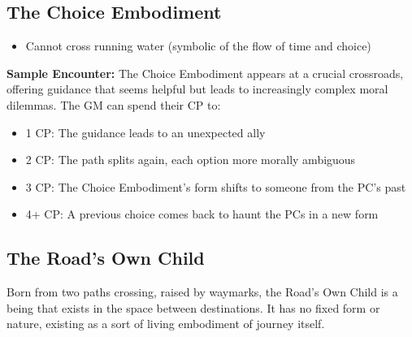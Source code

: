 \documentclass[11pt]{article}
\newenvironment{monsterentry}[1]{%
  \begin{mdframed}[backgroundcolor=shadecolor, linewidth=0pt, leftmargin=0pt, rightmargin=0pt]%
  \subsection*{#1}%
}{%
  \end{mdframed}%
}
\begin{document}
\begin{monsterentry}{The Choice Embodiment}
\begin{itemize}
    \item Cannot cross running water (symbolic of the flow of time and choice)
\end{itemize}
\textbf{Sample Encounter:} The Choice Embodiment appears at a crucial crossroads, offering guidance that seems helpful but leads to increasingly complex moral dilemmas. The GM can spend their CP to:
\begin{itemize}
    \item 1 CP: The guidance leads to an unexpected ally
    \item 2 CP: The path splits again, each option more morally ambiguous
    \item 3 CP: The Choice Embodiment's form shifts to someone from the PC's past
    \item 4+ CP: A previous choice comes back to haunt the PCs in a new form
\end{itemize}
\end{monsterentry}

\subsection{The Road's Own Child}

Born from two paths crossing, raised by waymarks, the Road's Own Child is a being that exists in the space between destinations. It has no fixed form or nature, existing as a sort of living embodiment of journey itself.
\end{document}
